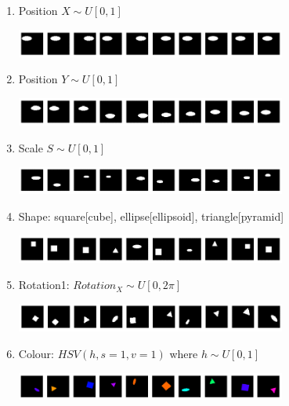         \begin{enumerate}
            \item Position $X\sim U[0, 1]$
            \begin{center}
                \includegraphics[width=0.7\textwidth]{imgs/1pos.png}
            \end{center}
            \item Position $Y\sim U[0, 1]$
            \begin{center}
                \includegraphics[width=0.7\textwidth]{imgs/2pos.png}
            \end{center}
            \item Scale $S\sim U[0, 1]$
            \begin{center}
                \includegraphics[width=0.7\textwidth]{imgs/2pos_scl.png}
            \end{center}
            \item Shape: square[cube], ellipse[ellipsoid], triangle[pyramid]
            \begin{center}
                \includegraphics[width=0.7\textwidth]{imgs/2pos_scl_shape.png}
            \end{center}
            \item Rotation1: $Rotation_X\sim U[0, 2\pi]$
            \begin{center}
                \includegraphics[width=0.7\textwidth]{imgs/2pos_scl_shape_1rot.png}
            \end{center}
            \item Colour: $HSV(h, s=1, v=1)$ where $h\sim U[0, 1]$
            \begin{center}
                \includegraphics[width=0.7\textwidth]{imgs/2pos_scl_shape_1rot_col.png}

\end{center}
\end{enumerate}
